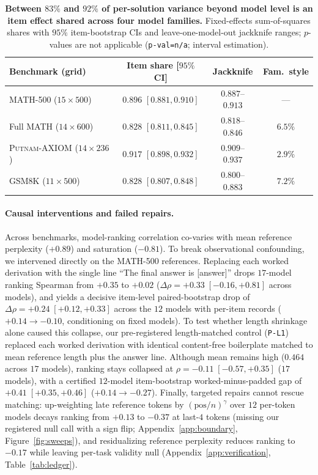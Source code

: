 \begin{table}[t]
\centering
\caption{\textbf{Between $83\%$ and $92\%$ of per-solution \tfa{} variance beyond model level is an item effect shared across four model families.} Fixed-effects sum-of-squares shares with $95\%$ item-bootstrap CIs and leave-one-model-out jackknife ranges; $p$-values are not applicable (\texttt{p-val=n/a}; interval estimation).}
\label{tab:decomp}
\scriptsize
\setlength{\tabcolsep}{2.5pt}
\begin{tabular}{@{}lccc@{}}
\toprule
Benchmark (grid) & Item share [$95\%$ CI] & Jackknife & Fam.\ style \\
\midrule
\textsc{MATH-500} ($15{\times}500$) & $0.896$ $[0.881, 0.910]$ & $0.887$--$0.913$ & --- \\
Full \textsc{MATH} ($14{\times}600$) & $0.828$ $[0.811, 0.845]$ & $0.818$--$0.846$ & $6.5\%$ \\
\textsc{Putnam-AXIOM} ($14{\times}236$) & $0.917$ $[0.898, 0.932]$ & $0.909$--$0.937$ & $2.9\%$ \\
\textsc{GSM8K} ($11{\times}500$) & $0.828$ $[0.807, 0.848]$ & $0.800$--$0.883$ & $7.2\%$ \\
\bottomrule
\end{tabular}
\end{table}

\paragraph{Causal interventions and failed repairs.}
Across benchmarks, \tfa{} model-ranking correlation co-varies with mean reference perplexity ($+0.89$) and saturation ($-0.81$).
To break observational confounding, we intervened directly on the \textsc{MATH-500} references.
Replacing each worked derivation with the single line ``The final answer is [answer]'' drops $17$-model ranking Spearman from $+0.35$ to $+0.02$ ($\Delta\rho = +0.33 \; [-0.16, +0.81]$ across models), and yields a decisive item-level paired-bootstrap drop of $\Delta\rho = +0.24 \; [+0.12, +0.33]$ across the $12$ models with per-item records ($+0.14 \to -0.10$, conditioning on fixed models).
To test whether length shrinkage alone caused this collapse, our pre-registered length-matched control (\texttt{P-L1}) replaced each worked derivation with identical content-free boilerplate matched to mean reference length plus the answer line.
Although mean \tfa{} remains high ($0.464$ across $17$ models), ranking stays collapsed at $\rho = -0.11 \; [-0.57, +0.35]$ ($17$ models), with a certified $12$-model item-bootstrap worked-minus-padded gap of $+0.41 \; [+0.35, +0.46]$ ($+0.14 \to -0.27$).
Finally, targeted repairs cannot rescue matching: up-weighting late reference tokens by $(\mathrm{pos}/n)^\gamma$ over $12$ per-token models decays ranking from $+0.13$ to $-0.37$ at last-$4$ tokens (missing our registered null call with a sign flip; Appendix~\ref{app:boundary}, Figure~\ref{fig:sweeps}), and residualizing reference perplexity reduces ranking to $-0.17$ while leaving per-task validity null (Appendix~\ref{app:verification}, Table~\ref{tab:ledger}).
